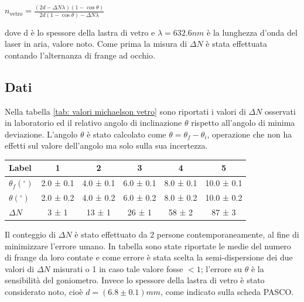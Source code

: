 \documentclass[a4paper]{article}
\begin{document}
\begin{center}
    $n_{\text{vetro}} = \frac{(2d - \Delta N \lambda)(1 - \cos\theta)}{2d(1 - \cos\theta) - \Delta N \lambda}$
\label{eq:indice rifrazione vetro}
\end{center}
dove d è lo spessore della lastra di vetro e $\lambda=632.6nm$ è la lunghezza d'onda del laser in aria, valore noto.
Come prima la misura di $\Delta N$ è stata effettuata contando l'alternanza di frange ad occhio.
\subsection{Dati}
Nella tabella \ref{tab: valori michaelson vetro} sono riportati i valori di $\Delta N$ osservati in laboratorio ed il relativo angolo di inclinazione $\theta$ rispetto all'angolo di minima deviazione. L'angolo $\theta$ è stato calcolato come $\theta = \theta_f - \theta_i$, operazione che non ha effetti sul valore dell'angolo ma solo sulla sua incertezza.

\begin{table}[htbp]
\centering
\begin{tabular}{|l|ccccc|}
\hline
Label & 1 & 2 & 3 & 4 & 5 \\\hline\hline
$\theta_f(^\circ)$ & 2.0 ± 0.1 & 4.0 ± 0.1 & 6.0 ± 0.1 & 8.0 ± 0.1 & 10.0 ± 0.1 \\\hline
$\theta(^\circ)$ & 2.0 ± 0.2 & 4.0 ± 0.2 & 6.0 ± 0.2 & 8.0 ± 0.2 & 10.0 ± 0.2 \\\hline
$\Delta N$ & 3 ± 1 & 13 ± 1 & 26 ± 1 & 58 ± 2 & 87 ± 3 \\\hline
\end{tabular}
\end{table}

Il conteggio di $\Delta N$ è stato effettuato da 2 persone contemporaneamente, al fine di minimizzare l'errore umano. In tabella sono state riportate le medie del numero di frange da loro contate e come errore è stata scelta la semi-dispersione dei due valori di $\Delta N$ misurati o 1 in caso tale valore fosse $<1$; l'errore su $\theta$ è la sensibilità del goniometro. Invece lo spessore della lastra di vetro è stato considerato noto, cioè $d=(6.8 \pm 0.1)mm$, come indicato sulla scheda PASCO.
\end{document}
